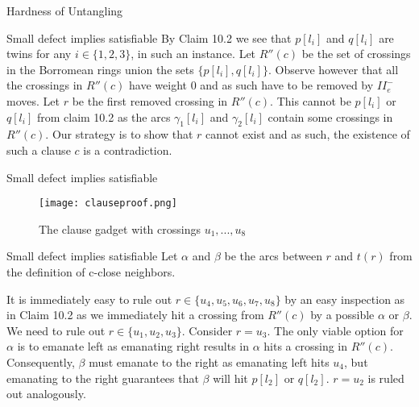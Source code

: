 \documentclass{beamer}
\begin{document}
\begin{section}{Hardness of Untangling}
    \begin{frame}{Small defect implies satisfiable}
        By Claim 10.2 we see that $p[l_i]$ and $q[l_i]$ are twins for any $i\in \{1,2,3\}$, in such an instance. 
        \newline
        \newline
        Let $R''(c)$ be the set of crossings in the Borromean rings union the sets $\{p[l_i],q[l_i]\}$. Observe however that all the crossings in $R''(c)$ have weight $0$ and as such have to be removed by $II^-_e$ moves. 
        \newline
        \newline
        Let $r$ be the first removed crossing in $R''(c)$. This cannot be $p[l_i]$ or $q[l_i]$ from claim 10.2 as the arcs $\gamma_1[l_i]$ and $\gamma_2[l_i]$ contain some crossings in $R''(c)$. 
        \newline
        \newline
        Our strategy is to show that $r$ cannot exist and as such, the existence of such a clause $c$ is a contradiction. 
    \end{frame}{}
    
    \begin{frame}{Small defect implies satisfiable}
        \begin{figure}
            \texttt{[image: clauseproof.png]}
            \caption{The clause gadget with crossings $u_1,...,u_8$}
        \end{figure}
    \end{frame}{}
    
    \begin{frame}{Small defect implies satisfiable}
        Let $\alpha$ and $\beta$ be the arcs between $r$ and $t(r)$ from the definition of c-close neighbors. 
        
        It is immediately easy to rule out $r\in \{u_4,u_5,u_6,u_7,u_8\}$ by an easy inspection as in Claim 10.2 as we immediately hit a crossing from $R''(c)$ by a possible $\alpha$ or $\beta$. 
        \newline
        \newline
        We need to rule out $r\in \{u_1,u_2,u_3\}$. 
        \newline
        \newline
        Consider $r=u_3$. 
        The only viable option for $\alpha$ is to emanate left as emanating right results in $\alpha$ hits a crossing in $R''(c)$. Consequently, $\beta$ must emanate to the right as emanating left hits $u_4$, but emanating to the right guarantees that $\beta$ will hit $p[l_2]$ or $q[l_2]$. 
        \newline
        \newline
        $r=u_2$ is ruled out analogously. 
    \end{frame}{}
    

\end{section}
\end{document}
